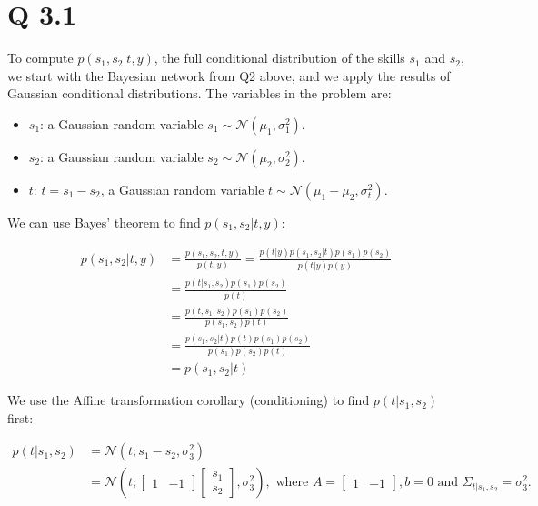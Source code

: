 
\section*{Q 3.1}
To compute $p(s_1, s_2|t, y)$, the full conditional distribution of the skills $s_1$ and $s_2$, we start with the Bayesian network from Q2 above, and we apply the results of Gaussian conditional distributions. The variables in the problem are:

\begin{itemize}
    \item $s_1$: a Gaussian random variable $s_1 \sim \mathcal{N}(\mu_1, \sigma_1^2)$.
    \item $s_2$: a Gaussian random variable $s_2 \sim \mathcal{N}(\mu_2, \sigma_2^2)$.
    \item $t$: $t = s_1 - s_2$, a Gaussian random variable $t \sim \mathcal{N}(\mu_1 - \mu_2, \sigma_t^2)$.
\end{itemize}

We can use Bayes' theorem to find $p(s_1, s_2|t, y)$:

\begin{align*}
    p(s_1, s_2|t, y) &= \frac{p(s_1, s_2, t, y)}{p(t, y)} = \frac{p(t|y) p(s_1, s_2|t) p(s_1) p(s_2)}{p(t|y) p(y)} \\
    &= \frac{p(t|s_1, s_2) p(s_1) p(s_2)}{p(t)} \\
    &= \frac{p(t, s_1, s_2) p(s_1) p(s_2)}{p(s_1, s_2) p(t)} \\
    &= \frac{p(s_1, s_2|t) p(t) p(s_1) p(s_2)}{p(s_1) p(s_2) p(t)} \\
    &= p(s_1, s_2|t)
\end{align*}

We use the Affine transformation corollary (conditioning) to find $p(t|s_1, s_2)$ first:

\begin{align*}
    p(t|s_1, s_2) &= \mathcal{N}\left(t; s_1 - s_2, \sigma_3^2\right) \\
    &= \mathcal{N}\left(t; \begin{bmatrix} 1 & -1 \end{bmatrix} \begin{bmatrix} s_1 \\ s_2 \end{bmatrix}, \sigma_3^2\right), \text{ where } A = \begin{bmatrix} 1 & -1 \end{bmatrix}, b = 0 \text{ and } \Sigma_{t|s_1, s_2} = \sigma_3^2.
\end{align*}

